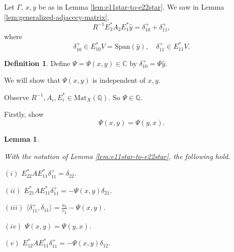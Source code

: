 \documentclass[
]{book}
\newtheorem{lemma}{Lemma}[chapter]
\theoremstyle{definition}
\newtheorem{definition}{Definition}[chapter]
\theoremstyle{definition}
\theoremstyle{definition}
\theoremstyle{definition}
\theoremstyle{remark}
\begin{document}
Let \(\Gamma\), \(x, y\) be as in Lemma \ref{lem:e11star-to-e22star}.
We saw in Lemma \ref{lem:generalized-adjacecy-matrix},
\[R^{-1}E^*_2A_2E^*_1\hat{y} = \delta^+_{10} + \delta^+_{11},\]
where
\[\delta^+_{10}\in E^*_{10}V = \mathrm{Span}(\hat{y}), \quad \delta^+_{11}\in E^*_{11}V.\]

\begin{definition}
\protect\hypertarget{def:Psi}{}\label{def:Psi}Define \(\Psi = \Psi(x,y) \in \mathbb{C}\) by \(\delta^+_{10} = \Psi\hat{y}\).
\end{definition}

We will show that \(\Psi(x,y)\) is independent of \(x, y\).

Observe \(R^{-1}, A_i, E^*_i\in \mathrm{Mat}_X(\mathbb{Q})\). So \(\Psi\in \mathbb{Q}\).

Firstly, show
\[\Psi(x,y) = \Psi(y,x).\]

\begin{lemma}
\protect\hypertarget{lem:map-e11star-to-e22star}{}\label{lem:map-e11star-to-e22star}

With the notation of Lemma \ref{lem:e11star-to-e22star}, the following hold.

\((i)\) \(E^*_{22}AE^*_{11}\delta^+_{11} = \delta_{22}\).

\((ii)\) \(E^*_{21}AE^*_{11}\delta^+_{11} = -\Psi(x,y)\delta_{21}\).

\((iii)\) \(\langle \delta^+_{11}, \delta_{11}\rangle = \frac{a_2}{c_2} - \Psi(x,y)\).

\((iv)\) \(\Psi(x,y) = \Psi(y,x)\).

\((v)\) \(E^*_{12}AE^*_{11}\delta^+_{11} = -\Psi(x,y)\delta_{12}\).

\end{lemma}
\end{document}
